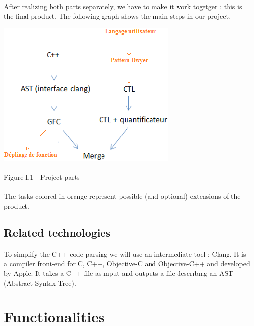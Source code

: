 \documentclass{report}
\begin{document}
\paragraph{}
\hspace{4mm}After realizing both parts separately, we have to make it work togetger : this is the final product.
The following graph shows the main steps in our project.

\begin{center}
\includegraphics[scale=0.7]{data/tasks}
~\\~\\Figure I.1 - Project parts
\end{center}

\paragraph{}
\hspace{4mm}The tasks colored in orange represent possible (and optional) extensions of the product.

\subsection{Related technologies}

\paragraph{}
\hspace{4mm}To simplify the C++ code parsing we will use an intermediate tool : Clang. It is a compiler front-end for C, C++, Objective-C and Objective-C++ and developed by Apple. It takes a C++ file as input and outputs a file describing an AST (Abstract Syntax Tree).

\section{Functionalities}
\end{document}
